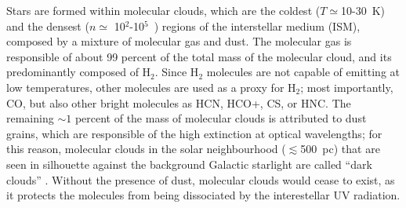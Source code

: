 \documentclass[12pt]{mythesis}
\begin{document}

Stars are formed within molecular clouds, which are the coldest ($T\simeq$10-30~K) and the densest ($n\simeq$ 10$^2$-10$^5$~\cmcu) regions of the interstellar medium (ISM), composed by a mixture of molecular gas and dust. The molecular gas is responsible of about 99 percent of the total mass of the molecular cloud, and its predominantly composed of H$_2$. Since H$_2$ molecules are not capable of emitting at low temperatures, other molecules are used as a proxy for H$_2$; most importantly, CO, but also other bright molecules as HCN, HCO+, CS, or HNC. The remaining $\sim 1$ percent of the mass of molecular clouds is attributed to dust grains, which are responsible of the high extinction at optical wavelengths; for this reason, molecular clouds in the solar neighbourhood ($\lesssim$500~pc) that are seen in silhouette against the background Galactic starlight are called ``dark clouds'' \citep{bergin2007}. Without the presence of dust, molecular clouds would cease to exist, as it protects the molecules from being dissociated by the interestellar UV radiation.

\end{document}
